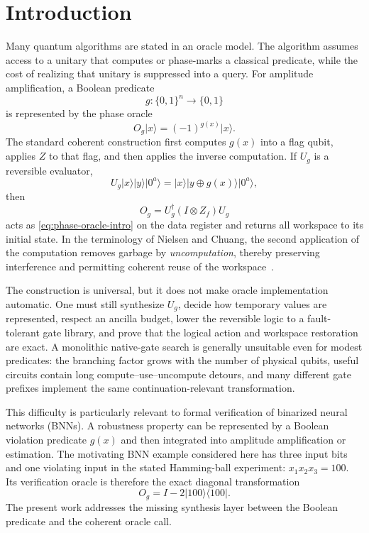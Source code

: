 \section{Introduction}

Many quantum algorithms are stated in an oracle model.  The algorithm assumes access to a unitary that computes or phase-marks a classical predicate, while the cost of realizing that unitary is suppressed into a query.  For amplitude amplification, a Boolean predicate
\begin{equation}
g:\{0,1\}^{n}\rightarrow\{0,1\}
\end{equation}
is represented by the phase oracle
\begin{equation}
\boxed{
O_g\lvert x\rangle=(-1)^{g(x)}\lvert x\rangle.
}
\label{eq:phase-oracle-intro}
\end{equation}
The standard coherent construction first computes $g(x)$ into a flag qubit, applies $Z$ to that flag, and then applies the inverse computation.  If $U_g$ is a reversible evaluator,
\begin{equation}
U_g\lvert x\rangle\lvert y\rangle\lvert0^a\rangle
=\lvert x\rangle\lvert y\oplus g(x)\rangle\lvert0^a\rangle,
\label{eq:evaluator-intro}
\end{equation}
then
\begin{equation}
\boxed{
O_g=U_g^\dagger(I\otimes Z_f)U_g
}
\label{eq:compute-phase-uncompute-intro}
\end{equation}
acts as \eqref{eq:phase-oracle-intro} on the data register and returns all workspace to its initial state.  In the terminology of Nielsen and Chuang, the second application of the computation removes garbage by \emph{uncomputation}, thereby preserving interference and permitting coherent reuse of the workspace~\cite{nielsen2010quantum}.

The construction is universal, but it does not make oracle implementation automatic.  One must still synthesize $U_g$, decide how temporary values are represented, respect an ancilla budget, lower the reversible logic to a fault-tolerant gate library, and prove that the logical action and workspace restoration are exact.  A monolithic native-gate search is generally unsuitable even for modest predicates: the branching factor grows with the number of physical qubits, useful circuits contain long compute--use--uncompute detours, and many different gate prefixes implement the same continuation-relevant transformation.

This difficulty is particularly relevant to formal verification of binarized neural networks (BNNs).  A robustness property can be represented by a Boolean violation predicate $g(x)$ and then integrated into amplitude amplification or estimation.  The motivating BNN example considered here has three input bits and one violating input in the stated Hamming-ball experiment: $x_1x_2x_3=100$.  Its verification oracle is therefore the exact diagonal transformation
\begin{equation}
O_g=I-2\lvert100\rangle\!\langle100\rvert.
\label{eq:bnn-marked-oracle}
\end{equation}
The present work addresses the missing synthesis layer between the Boolean predicate and the coherent oracle call.

